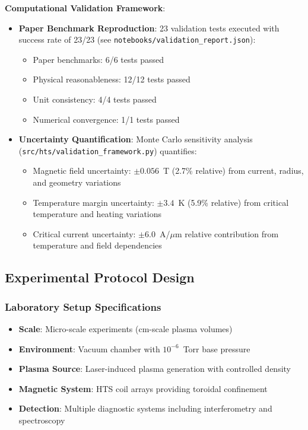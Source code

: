 \documentclass[10pt,twocolumn]{article}
\begin{document}
\textbf{Computational Validation Framework}:

\begin{itemize}
\item \textbf{Paper Benchmark Reproduction}: 23 validation tests executed with success rate of 23/23 (see \texttt{notebooks/validation\_report.json}):
   \begin{itemize}
   \item Paper benchmarks: 6/6 tests passed
   \item Physical reasonableness: 12/12 tests passed  
   \item Unit consistency: 4/4 tests passed
   \item Numerical convergence: 1/1 tests passed
   \end{itemize}

\item \textbf{Uncertainty Quantification}: Monte Carlo sensitivity analysis (\texttt{src/hts/validation\_framework.py}) quantifies:
   \begin{itemize}
   \item Magnetic field uncertainty: $\pm 0.056$~T (2.7\% relative) from current, radius, and geometry variations
   \item Temperature margin uncertainty: $\pm 3.4$~K (5.9\% relative) from critical temperature and heating variations
   \item Critical current uncertainty: $\pm 6.0$~A/$\mu$m relative contribution from temperature and field dependencies
   \end{itemize}
\end{itemize}

\subsection{Experimental Protocol Design}

\subsubsection{Laboratory Setup Specifications}
\begin{itemize}
\item \textbf{Scale}: Micro-scale experiments (cm-scale plasma volumes)
\item \textbf{Environment}: Vacuum chamber with $10^{-6}$~Torr base pressure
\item \textbf{Plasma Source}: Laser-induced plasma generation with controlled density
\item \textbf{Magnetic System}: HTS coil arrays providing toroidal confinement
\item \textbf{Detection}: Multiple diagnostic systems including interferometry and spectroscopy
\end{itemize}
\end{document}
